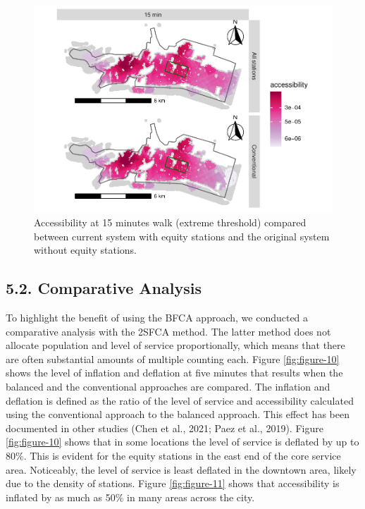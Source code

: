 \documentclass[]{elsarticle} %
\begin{document}
\begin{figure}

{\centering \includegraphics[width=0.9\linewidth]{Bike-share-spatial-equity_files/figure-latex/figure-9-1} 

}

\caption{Accessibility at 15 minutes walk (extreme threshold) compared between current system with equity stations and the original system without equity stations.}\label{fig:figure-9}
\end{figure}

\hypertarget{comparative-analysis}{%
\subsection{5.2. Comparative Analysis}\label{comparative-analysis}}

To highlight the benefit of using the BFCA approach, we conducted a
comparative analysis with the 2SFCA method. The latter method does not
allocate population and level of service proportionally, which means
that there are often substantial amounts of multiple counting each.
Figure \ref{fig:figure-10} shows the level of inflation and deflation at
five minutes that results when the balanced and the conventional
approaches are compared. The inflation and deflation is defined as the
ratio of the level of service and accessibility calculated using the
conventional approach to the balanced approach. This effect has been
documented in other studies (Chen et al., 2021; Paez et al., 2019).
Figure \ref{fig:figure-10} shows that in some locations the level of
service is deflated by up to 80\%. This is evident for the equity
stations in the east end of the core service area. Noticeably, the level
of service is least deflated in the downtown area, likely due to the
density of stations. Figure \ref{fig:figure-11} shows that accessibility
is inflated by as much as 50\% in many areas across the city.
\end{document}
